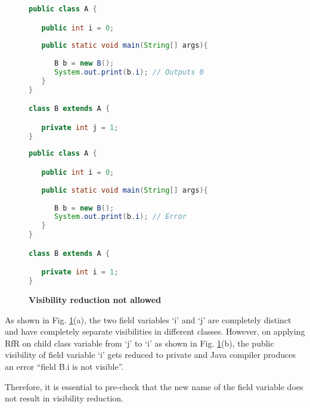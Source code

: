 \begin{figure}[th]
\centering
\begin{minipage}[t]{0.75\linewidth}
\begin{lstlisting}[language=java, basicstyle=\scriptsize\ttfamily,frame=single]
public class A {

   public int i = 0;
	
   public static void main(String[] args){
	
      B b = new B();
      System.out.print(b.i); // Outputs 0
   }
}

class B extends A {

   private int j = 1;
}
\end{lstlisting}
\end{minipage}
\hfill
\begin{minipage}[t]{0.75\linewidth}
\begin{lstlisting}[language=java, basicstyle=\scriptsize\ttfamily,frame=single]
public class A {

   public int i = 0;
	
   public static void main(String[] args){
	
      B b = new B();
      System.out.print(b.i); // Error
   }
}

class B extends A {

   private int i = 1;
}
\end{lstlisting}
\end{minipage}
\caption{\textbf{Visibility reduction not allowed}}
\label{figure:jtoi}
\end{figure}


As shown in Fig. \ref{figure:jtoi}(a), the two field variables `i' and `j' are completely distinct and have completely separate visibilities in different classes. However, on applying RfR on child class variable from `j' to `i' as shown in Fig. \ref{figure:jtoi}(b), the public visibility of field variable `i' gets reduced to private and Java compiler produces an error ``field B.i is not visible''. 

Therefore, it is essential to pre-check that the new name of the field variable does not result in visibility reduction. 